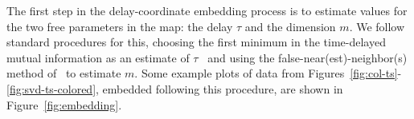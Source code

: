 The first step in the delay-coordinate embedding process is to
estimate values for the two free parameters in the map: the delay
$\tau$ and the dimension $m$.  We follow standard procedures for this,
choosing the first minimum in the time-delayed mutual information as
an estimate of $\tau$~\cite{fraser-swinney} and using the
false-near(est)-neighbor(s) method of~\cite{KBA92} to estimate $m$.
Some example plots of data from
Figures~\ref{fig:col-ts}-\ref{fig:svd-ts-colored}, embedded following
this procedure, are shown in Figure~\ref{fig:embedding}.
%
%
%
